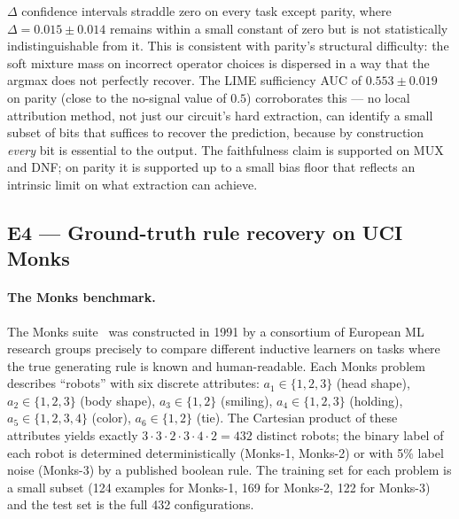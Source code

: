 \documentclass{article}
\begin{document}
$\Delta$ confidence intervals straddle zero on every task except parity, where $\Delta = 0.015 \pm 0.014$ remains within a small constant of zero but is not statistically indistinguishable from it.
This is consistent with parity's structural difficulty: the soft mixture mass on incorrect operator choices is dispersed in a way that the argmax does not perfectly recover.
The LIME sufficiency AUC of $0.553 \pm 0.019$ on parity (close to the no-signal value of $0.5$) corroborates this --- no local attribution method, not just our circuit's hard extraction, can identify a small subset of bits that suffices to recover the prediction, because by construction \emph{every} bit is essential to the output.
The faithfulness claim is supported on MUX and DNF; on parity it is supported up to a small bias floor that reflects an intrinsic limit on what extraction can achieve.

\subsection{E4 --- Ground-truth rule recovery on UCI Monks}
\label{sec:e4}

\paragraph{The Monks benchmark.}
The Monks suite~\citep{thrun1991monks} was constructed in 1991 by a consortium of European ML research groups precisely to compare different inductive learners on tasks where the true generating rule is known and human-readable.
Each Monks problem describes ``robots'' with six discrete attributes:
$a_1 \in \{1,2,3\}$ (head shape), $a_2 \in \{1,2,3\}$ (body shape), $a_3 \in \{1,2\}$ (smiling), $a_4 \in \{1,2,3\}$ (holding), $a_5 \in \{1,2,3,4\}$ (color), $a_6 \in \{1,2\}$ (tie).
The Cartesian product of these attributes yields exactly $3 \cdot 3 \cdot 2 \cdot 3 \cdot 4 \cdot 2 = 432$ distinct robots; the binary label of each robot is determined deterministically (Monks-1, Monks-2) or with 5\% label noise (Monks-3) by a published boolean rule.
The training set for each problem is a small subset (124 examples for Monks-1, 169 for Monks-2, 122 for Monks-3) and the test set is the full 432 configurations.
\end{document}
